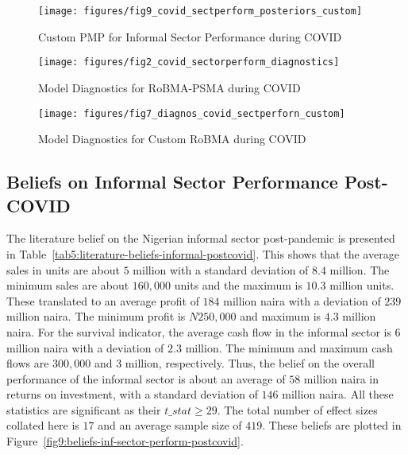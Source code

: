 \documentclass[a4paper, 12pt]{article}
\begin{document}
    \begin{figure}[H]
        \centering
        \texttt{[image: figures/fig9\_covid\_sectperform\_posteriors\_custom]}
        \caption{Custom PMP for Informal Sector Performance during COVID}
        \label{fig6:custom-pmp-covid-sectorperform-posteriors}
    \end{figure}

    \begin{figure}[H]
        \centering
        \texttt{[image: figures/fig2\_covid\_sectorperform\_diagnostics]}
        \caption{Model Diagnostics for RoBMA-PSMA during COVID}
        \label{fig7:diagnostics-robma-psma-covid-sectorperform}
    \end{figure}

    \begin{figure}[H]
        \centering
        \texttt{[image: figures/fig7\_diagnos\_covid\_sectperforn\_custom]}
        \caption{Model Diagnostics for Custom RoBMA during COVID}
        \label{fig8:diagnostics-custom-pmp-covid-sectorperform}
    \end{figure}

    \subsection{Beliefs on Informal Sector Performance Post-COVID}\label{subsec4.2:literature-beliefs-on-informal-sector-performance-post-covid-19}
    The literature belief on the Nigerian informal sector post-pandemic is presented in Table~\ref{tab5:literature-beliefs-informal-postcovid}. This shows that the average sales in units are about $5$ million with a standard deviation of $8.4$ million. The minimum sales are about $160,000$ units and the maximum is $10.3$ million units. These translated to an average profit of $184$ million naira with a deviation of $239$ million naira. The minimum profit is $N250,000$ and maximum is $4.3$ million naira. For the survival indicator, the average cash flow in the informal sector is $6$ million naira with a deviation of $2.3$ million. The minimum and maximum cash flows are $300,000$ and $3$ million, respectively. Thus, the belief on the overall performance of the informal sector is about an average of $58$ million naira in returns on investment, with a standard deviation of $146$ million naira. All these statistics are significant as their $t\_stat \geq 29$. The total number of effect sizes collated here is $17$ and an average sample size of $419$. These beliefs are plotted in Figure~\ref{fig9:beliefs-inf-sector-perform-postcovid}.
\end{document}

